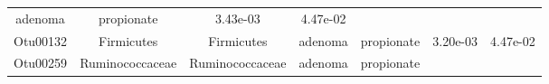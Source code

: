 \documentclass[11pt,]{article}
\begin{document}
\begin{longtable}[]{@{}ccccccc@{}}
\begin{minipage}[t]{0.09\columnwidth}
adenoma\strut
\end{minipage} & \begin{minipage}[t]{0.11\columnwidth}\centering\strut
propionate\strut
\end{minipage} & \begin{minipage}[t]{0.09\columnwidth}\centering\strut
3.43e-03\strut
\end{minipage} & \begin{minipage}[t]{0.09\columnwidth}\centering\strut
4.47e-02\strut
\end{minipage}\tabularnewline
\begin{minipage}[t]{0.09\columnwidth}\centering\strut
Otu00132\strut
\end{minipage} & \begin{minipage}[t]{0.17\columnwidth}\centering\strut
Firmicutes\strut
\end{minipage} & \begin{minipage}[t]{0.17\columnwidth}\centering\strut
Firmicutes\strut
\end{minipage} & \begin{minipage}[t]{0.09\columnwidth}\centering\strut
adenoma\strut
\end{minipage} & \begin{minipage}[t]{0.11\columnwidth}\centering\strut
propionate\strut
\end{minipage} & \begin{minipage}[t]{0.09\columnwidth}\centering\strut
3.20e-03\strut
\end{minipage} & \begin{minipage}[t]{0.09\columnwidth}\centering\strut
4.47e-02\strut
\end{minipage}\tabularnewline
\begin{minipage}[t]{0.09\columnwidth}\centering\strut
Otu00259\strut
\end{minipage} & \begin{minipage}[t]{0.17\columnwidth}\centering\strut
Ruminococcaceae\strut
\end{minipage} & \begin{minipage}[t]{0.17\columnwidth}\centering\strut
Ruminococcaceae\strut
\end{minipage} & \begin{minipage}[t]{0.09\columnwidth}\centering\strut
adenoma\strut
\end{minipage} & \begin{minipage}[t]{0.11\columnwidth}\centering\strut
propionate\strut
\end{minipage} & \begin{minipage}[t]{0.09\columnwidth}\centering\strut

\end{minipage}
\end{longtable}
\end{document}
